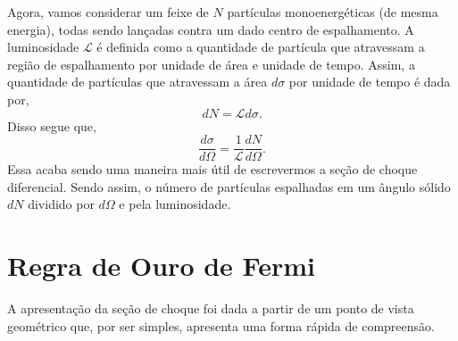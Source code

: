 Agora, vamos considerar um feixe de $N$ partículas monoenergéticas (de mesma
energia), todas sendo lançadas contra um dado centro de espalhamento. A
luminosidade $\mathcal{L}$ é definida como a quantidade de partícula que
atravessam a região de espalhamento por unidade de área e unidade de tempo.
Assim, a quantidade de partículas que atravessam a área $d\sigma$ por unidade
de tempo é dada por,
\begin{equation}
	dN = \mathcal{L} d\sigma.
\end{equation}
Disso segue que,
\begin{equation}
	\frac{d\sigma}{d\Omega} = \frac{1}{\mathcal{L}} \frac{dN}{d\Omega}.
\end{equation}
Essa acaba sendo uma maneira mais útil de escrevermos a seção de choque
diferencial. Sendo assim, o número de partículas espalhadas em um ângulo sólido
$dN$ dividido por $d\Omega$ e pela luminosidade.

\section{Regra de Ouro de Fermi}
A apresentação da seção de choque foi dada a partir de um ponto de vista geométrico
que, por ser simples, apresenta uma forma rápida de compreensão.



